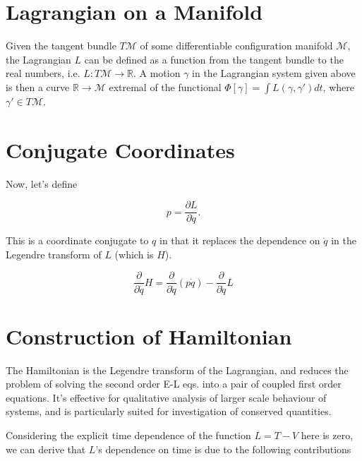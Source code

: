 \documentclass{article}\usepackage[]{graphicx}\usepackage[]{color}
\newcommand{\pd}{\frac{\partial }{\partial \dot{q}}}
\begin{document}
\section{Lagrangian on a Manifold}
Given the tangent bundle $T\mathcal{M}$ of some differentiable configuration manifold $\mathcal{M}$, the Lagrangian $L$ can be defined as a function from the tangent bundle to the real numbers, i.e. $L:T\mathcal{M}\rightarrow\mathbb{R}$. A motion $\gamma$ in the Lagrangian system given above is then a curve $\mathbb{R}\rightarrow\mathcal{M}$ extremal of the functional $\Phi[\gamma]=\int L(\gamma ,\gamma')dt$, where $\gamma'\in T\mathcal{M}$.




\pagebreak



\section{Conjugate Coordinates}

Now, let's define

\begin{equation}
p=\frac{\partial L}{\partial \dot{q}}.
\end{equation}



This is a coordinate conjugate to $q$ in that it replaces the dependence on $\dot{q}$ in the Legendre transform of $L$ (which is $H$). 

$$
\frac{\partial }{\partial \dot{q}}H=\pd\left( p\dot{q} \right)-\pd L
$$

\section{Construction of Hamiltonian}

The Hamiltonian is the Legendre transform of the Lagrangian, and reduces the problem of solving the second order E-L eqs. into a pair of coupled first order equations. It's effective for qualitative analysis of larger scale behaviour of systems, and is particularly suited for investigation of conserved quantities.



Considering the explicit time dependence of the function 
$L=T-V$ here is zero, we can derive that $L$'s dependence on time is due to the following contributions
\end{document}
